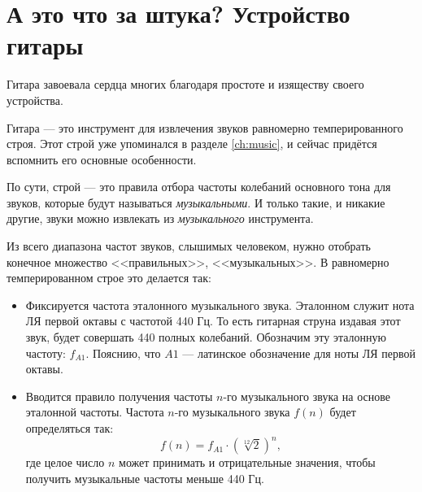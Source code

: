 \chapter{А это что за штука? Устройство гитары}
\label{ch:guitar}


Гитара завоевала сердца многих благодаря простоте и изяществу своего устройства.

Гитара --- это инструмент для извлечения звуков равномерно темперированного строя. Этот строй уже упоминался в разделе \ref{ch:music}, и сейчас придётся вспомнить его основные особенности.

По сути, строй --- это правила отбора частоты колебаний основного тона для звуков, которые будут называться \emph{музыкальными}. И только такие, и никакие другие, звуки можно извлекать из \emph{музыкального} инструмента.

Из всего диапазона частот звуков, слышимых человеком, нужно отобрать конечное множество <<правильных>>, <<музыкальных>>. В равномерно темперированном строе это делается так:
\begin{itemize}
    \item Фиксируется частота эталонного музыкального звука. Эталонном служит нота ЛЯ первой октавы с частотой 440 Гц. То есть гитарная струна издавая этот звук, будет совершать 440 полных колебаний. Обозначим эту эталонную частоту: $f_{A1}$. Пояснию, что $A1$ --- латинское обозначение для ноты ЛЯ первой октавы.
    
    \item Вводится правило получения частоты $n$-го музыкального звука на основе эталонной частоты. Частота $n$-го музыкального звука $f(n)$ будет определяться так: 
    \[
        f(n) = f_{A1}\cdot({\sqrt[12]{2}})^n,
    \]
    где целое число $n$ может принимать и отрицательные значения, чтобы получить музыкальные частоты меньше 440 Гц.
\end{itemize}

